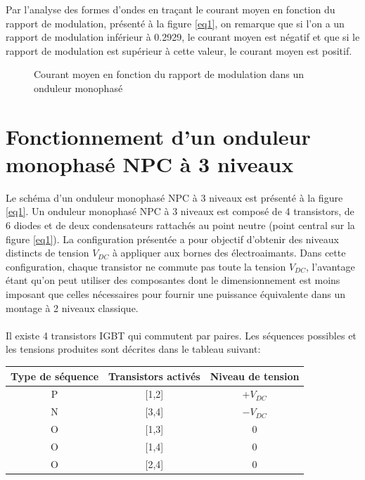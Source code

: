 Par l'analyse des formes d'ondes en traçant le courant moyen en fonction du rapport de modulation, présenté à la figure \ref{eq1}, on remarque que si l'on a un rapport de modulation inférieur à 0.2929, le courant moyen est négatif et que si le rapport de modulation est supérieur à cette valeur, le courant moyen est positif.

\begin{figure}[htb]
\caption{Courant moyen en fonction du rapport de modulation dans un onduleur monophasé}
\end{figure}

\section{Fonctionnement d'un onduleur monophasé NPC à 3 niveaux}
Le schéma d'un onduleur monophasé NPC à 3 niveaux est présenté à la figure \ref{eq1}. Un onduleur monophasé NPC à 3 niveaux est composé de 4 transistors, de 6 diodes et de deux condensateurs rattachés au point neutre (point central sur la figure \ref{eq1}). La configuration présentée a pour objectif d'obtenir des niveaux distincts de tension $V_{DC}$ à appliquer aux bornes des électroaimants. Dans cette configuration, chaque transistor ne commute pas toute la tension $V_{DC}$, l'avantage étant qu'on peut utiliser des composantes dont le dimensionnement est moins imposant que celles nécessaires pour fournir une puissance équivalente dans un montage à 2 niveaux classique. 

\paragraph{}Il existe 4 transistors IGBT qui commutent par paires. Les séquences possibles et les tensions produites sont décrites dans le tableau suivant:

\begin{table}[htb]
\centering
\begin{tabular}{ |c|c|c| }
\hline
  Type de séquence & Transistors activés & Niveau de tension \\\hline\hline
  P & [1,2] & $+V_{DC}$ \\\hline
  N & [3,4] & $-V_{DC}$ \\\hline
  O & [1,3] & $0$ \\\hline
  O & [1,4] & $0$ \\\hline
  O & [2,4] & $0$ \\\hline
\end{tabular}
\end{table}
